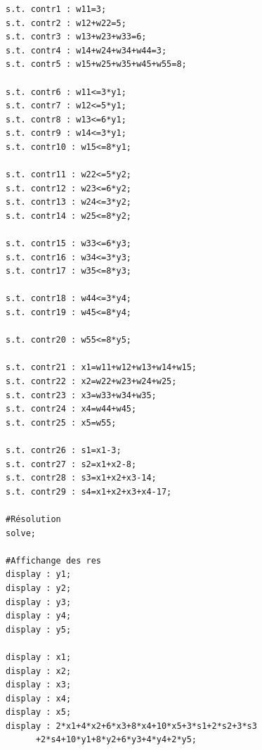 \documentclass[a4paper,11pt,twoside]{report}
\begin{document}
\begin{appendices}
\begin{verbatim}
s.t. contr1 : w11=3;
s.t. contr2 : w12+w22=5;
s.t. contr3 : w13+w23+w33=6;
s.t. contr4 : w14+w24+w34+w44=3;
s.t. contr5 : w15+w25+w35+w45+w55=8;

s.t. contr6 : w11<=3*y1;
s.t. contr7 : w12<=5*y1;
s.t. contr8 : w13<=6*y1;
s.t. contr9 : w14<=3*y1;
s.t. contr10 : w15<=8*y1;

s.t. contr11 : w22<=5*y2;
s.t. contr12 : w23<=6*y2;
s.t. contr13 : w24<=3*y2;
s.t. contr14 : w25<=8*y2;

s.t. contr15 : w33<=6*y3;
s.t. contr16 : w34<=3*y3;
s.t. contr17 : w35<=8*y3;

s.t. contr18 : w44<=3*y4;
s.t. contr19 : w45<=8*y4;

s.t. contr20 : w55<=8*y5;

s.t. contr21 : x1=w11+w12+w13+w14+w15;
s.t. contr22 : x2=w22+w23+w24+w25;
s.t. contr23 : x3=w33+w34+w35;
s.t. contr24 : x4=w44+w45;
s.t. contr25 : x5=w55;

s.t. contr26 : s1=x1-3;
s.t. contr27 : s2=x1+x2-8;
s.t. contr28 : s3=x1+x2+x3-14;
s.t. contr29 : s4=x1+x2+x3+x4-17;

#Résolution
solve;

#Affichange des res
display : y1;
display : y2;
display : y3;
display : y4;
display : y5;

display : x1;
display : x2;
display : x3;
display : x4;
display : x5;
display : 2*x1+4*x2+6*x3+8*x4+10*x5+3*s1+2*s2+3*s3
	  +2*s4+10*y1+8*y2+6*y3+4*y4+2*y5;
\end{verbatim}

\end{appendices}
\end{document}
